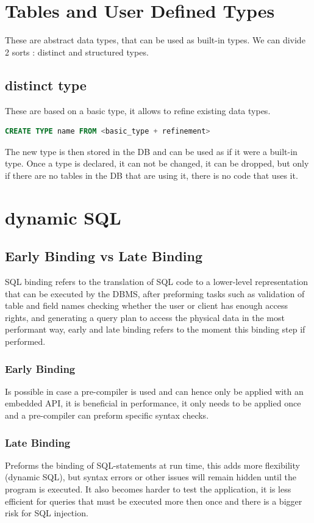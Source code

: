\documentclass{report}
\begin{document}
	\section{Tables and User Defined Types}	
	These are abstract data types, that can be used as built-in types. We can divide 2 sorts : distinct and structured types. 
	\subsection{distinct type}
	These are based on a basic type, it allows to refine existing data types.
	\begin{lstlisting}[language = sql]
	CREATE TYPE name FROM <basic_type + refinement>\end{lstlisting}
	The new type is then stored in the DB and can be used as if it were a built-in type. Once a type is declared, it can not be changed, it can be dropped, but only if there are no tables in the DB that are using it, there is no code that uses it. 
	\section{dynamic SQL}
	\subsection{Early Binding vs Late Binding}
	SQL binding refers to the translation of SQL code to a lower-level representation that can be executed by the DBMS, after preforming tasks such as validation of table and field names checking whether the user or client has enough access rights, and generating a query plan to access the physical data in the most performant way, early and late binding refers to the moment this binding step if performed.
	\subsubsection{Early Binding}
	Is possible in case a pre-compiler is used and can hence only be applied with an embedded API, it is beneficial in performance, it only needs to be applied once and a pre-compiler can preform specific syntax checks. 
	\subsubsection{Late Binding}
	Preforms the binding of SQL-statements at run time, this adds more flexibility (dynamic SQL), but syntax errors or other issues will remain hidden until the program is executed. It also becomes harder to test the application, it is less efficient for queries that must be executed more then once and there is a bigger risk for SQL injection. 
\end{document}
